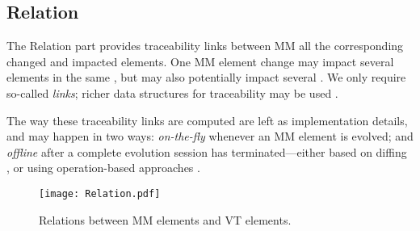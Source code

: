 \subsection{Relation}
\label{sec:Suggestion:Relation}

The \textsf{Relation} part provides traceability links between \textsf{MM}
all the corresponding \textsf{changed} and \textsf{impacted} elements.
One \textsf{MM} element change
may impact several elements in the same \viewtype, but may also potentially
impact several \viewtypes. We only require so-called \emph{links}; richer
data structures for traceability may be used \cite{Batot-Cabot-Gerard:2021}.

The way these traceability links are computed are left as implementation
details, and may happen in two ways: \emph{on-the-fly} whenever an \textsf{MM} element is evolved; and \emph{offline}
after a complete evolution session has terminated---either based on diffing \cite{Kehrer-Kelter-Taentzer:2011}, or using 
operation-based approaches \cite{J:Lippe-Oosterom:1992}.

\begin{figure}[t]
    \centering
    \texttt{[image: Relation.pdf]}
    \caption{\textsf{Relation}s between \textsf{MM} elements and \textsf{VT} elements.}
    \label{fig:Relation}
\end{figure}

